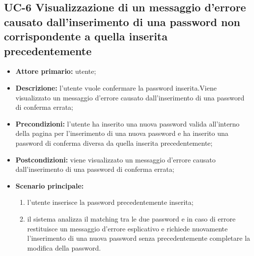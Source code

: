 \subsection{UC-6 Visualizzazione di un messaggio d'errore causato dall'inserimento di una password non corrispondente a quella inserita precedentemente}
\begin{itemize}
	\item \textbf{Attore primario:} utente;

	\item\textbf{Descrizione:} l'utente vuole confermare la password inserita.Viene visualizzato un messaggio d'errore causato dall'inserimento di una password di conferma errata;

	\item\textbf{Precondizioni:} l'utente ha inserito una nuova password valida all'interno della pagina per l'inserimento di una nuova password e ha inserito una password di conferma diversa da quella inserita precedentemente;

	\item\textbf{Postcondizioni:} viene visualizzato un messaggio d'errore causato dall'inserimento di una password di conferma errata;

	\item \textbf{Scenario principale:}
	      \begin{enumerate}
		      \item l'utente inserisce la password precedentemente inserita;
		      \item il sistema analizza il matching tra le due password e in caso di errore restituisce un messaggio d'errore esplicativo e richiede nuovamente l'inserimento di una nuova password senza precedentemente completare la modifica della password.
	      \end{enumerate}
\end{itemize}
